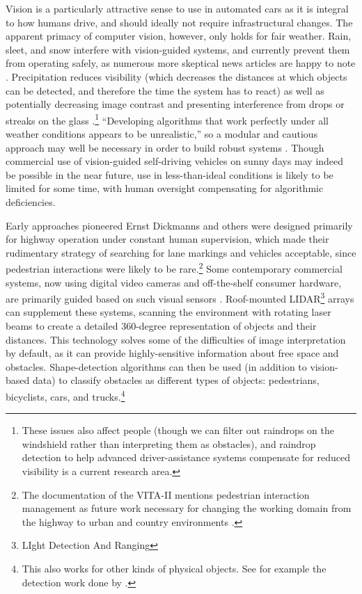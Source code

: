 Vision is a particularly attractive sense to use in automated cars
as it is integral to how humans drive, and should ideally not
require infrastructural changes. The apparent primacy of computer
vision, however, only holds for fair 
weather. Rain, sleet, and 
snow interfere with vision-guided systems, and currently prevent them
from operating safely, as numerous more skeptical news articles are
happy to note \cite{knightFurther} \cite{gomesObstacles}.
Precipitation reduces visibility (which decreases
the distances at which objects can be detected, and therefore the
time the system has to react) as well as potentially decreasing image
contrast and presenting interference from drops or
streaks on the glass
\cite{rainADAS}.\footnote{These issues also 
affect people (though we can filter out raindrops on the
windshield rather than interpreting them as obstacles), and raindrop
detection to help advanced driver-assistance systems compensate for
reduced visibility is a current research area.} 
``Developing algorithms that work perfectly
under all weather conditions appears to be unrealistic,'' so a
modular and cautious approach may well be necessary in order to build
robust systems \cite[p. 50]{rainADAS}. Though commercial use of
vision-guided self-driving vehicles on 
sunny days may indeed be possible in the near future, use in
less-than-ideal conditions is likely to be limited for some time,
with human oversight compensating for algorithmic deficiencies. 



Early approaches pioneered Ernst
Dickmanns and others were designed primarily for 
highway operation under constant human supervision, which made their
rudimentary strategy of searching for lane markings and vehicles
acceptable, since pedestrian interactions were likely to be
rare.\footnote{The documentation of the VITA-II mentions pedestrian
  interaction management as future work necessary for changing the
  working domain from the highway to urban and country environments \cite{ulmerVITA-II}.}
Some contemporary commercial systems, now using digital video cameras
and off-the-shelf consumer hardware, are primarily guided based on
such visual sensors \cite{makingBertha}. Roof-mounted
LIDAR\footnote{LIght Detection And Ranging} arrays can supplement
these systems, scanning the environment with 
rotating laser beams to create a detailed 360-degree
representation of objects and their distances. This technology
solves some of the difficulties of image interpretation by default, as
it can provide highly-sensitive information about free space and
obstacles. Shape-detection algorithms can then be used (in addition to
vision-based data) to classify obstacles as different types of
objects: pedestrians, bicyclists, cars, and trucks.\footnote{This also
  works for other kinds of physical objects. See for example the
  detection work done by \cite{fukuda}.}

